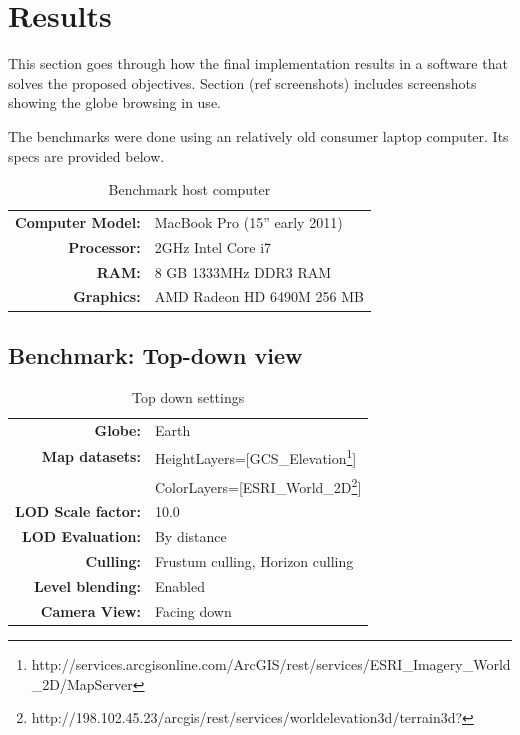 \chapter{Results}
This section goes through how the final implementation results in a software that solves the proposed objectives. Section (ref screenshots) includes screenshots showing the globe browsing in use.

The benchmarks were done using an relatively old consumer laptop computer. Its specs are provided below.

\begin{table}
  \centering
  \caption[]{Benchmark host computer}
    \label{table:benchmark host}
  \begin{tabular}{| r l |}
    \hline
      \textbf{Computer Model:}  & MacBook Pro (15'' early 2011) \\
      \textbf{Processor:}       & 2GHz Intel Core i7 \\
      \textbf{RAM:}             & 8 GB 1333MHz DDR3 RAM \\
      \textbf{Graphics:}        & AMD Radeon HD 6490M 256 MB \\
    \hline
  \end{tabular}
\end{table}


\section{Benchmark: Top-down view}
\begin{table}
  \centering
  \caption[]{Top down settings}
    \label{table:settingstopdown}
  \begin{tabular}{| r l |}
    \hline
      \textbf{Globe:}             & Earth \\
      \textbf{Map datasets:}      & HeightLayers=[GCS\_Elevation\footnote{http://services.arcgisonline.com/ArcGIS/rest/services/ESRI\_Imagery\_World\_2D/MapServer}] \\
                                  & ColorLayers=[ESRI\_World\_2D\footnote{http://198.102.45.23/arcgis/rest/services/worldelevation3d/terrain3d?}] \\
      \textbf{LOD Scale factor:}  & 10.0 \\
      \textbf{LOD Evaluation:}    & By distance \\
      \textbf{Culling:}           & Frustum culling, Horizon culling \\
      \textbf{Level blending:}    & Enabled \\
      \textbf{Camera View:}       & Facing down \\
    \hline
  \end{tabular}
\end{table}


